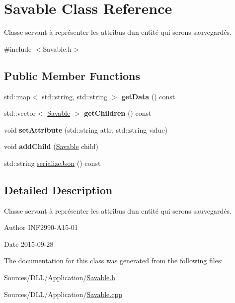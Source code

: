 \hypertarget{class_savable}{}\section{Savable Class Reference}
\label{class_savable}


Classe servant à représenter les attribus d\textquotesingle{}un entité qui serons sauvegardés.  




{\ttfamily \#include $<$Savable.\+h$>$}

\subsection*{Public Member Functions}
\begin{DoxyCompactItemize}
\item 
\hypertarget{class_savable_a3390d86dd63d09fcc78b7f1a8dfe7590}{}std\+::map$<$ std\+::string, std\+::string $>$ {\bfseries get\+Data} () const \label{class_savable_a3390d86dd63d09fcc78b7f1a8dfe7590}

\item 
\hypertarget{class_savable_a98e8f61b947ba8e200a2093dffb2d69e}{}std\+::vector$<$ \hyperlink{class_savable}{Savable} $>$ {\bfseries get\+Children} () const \label{class_savable_a98e8f61b947ba8e200a2093dffb2d69e}

\item 
\hypertarget{class_savable_a37c8c891c636ab68a025396d216c8a2b}{}void {\bfseries set\+Attribute} (std\+::string attr, std\+::string value)\label{class_savable_a37c8c891c636ab68a025396d216c8a2b}

\item 
\hypertarget{class_savable_a086a5d7b7acbf5f768f14b14689d07cc}{}void {\bfseries add\+Child} (\hyperlink{class_savable}{Savable} child)\label{class_savable_a086a5d7b7acbf5f768f14b14689d07cc}

\item 
std\+::string \hyperlink{group__inf2990_ga454a7c175c0864c3656283bafcb8413e}{serialize\+Json} () const 
\end{DoxyCompactItemize}


\subsection{Detailed Description}
Classe servant à représenter les attribus d\textquotesingle{}un entité qui serons sauvegardés. 

\begin{DoxyAuthor}{Author}
I\+N\+F2990-\/\+A15-\/01 
\end{DoxyAuthor}
\begin{DoxyDate}{Date}
2015-\/09-\/28 
\end{DoxyDate}


The documentation for this class was generated from the following files\+:\begin{DoxyCompactItemize}
\item 
Sources/\+D\+L\+L/\+Application/\hyperlink{_savable_8h}{Savable.\+h}\item 
Sources/\+D\+L\+L/\+Application/\hyperlink{_savable_8cpp}{Savable.\+cpp}\end{DoxyCompactItemize}
